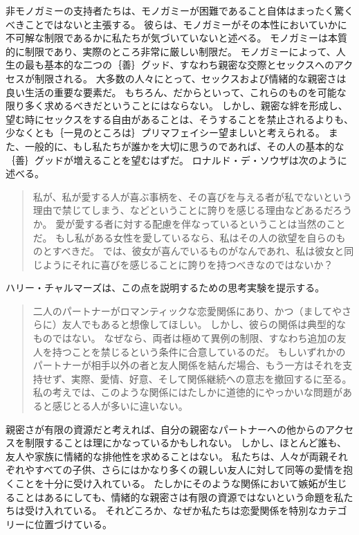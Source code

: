 \documentclass[paper=a4,book,openany]{jlreq}
\begin{document}
非モノガミーの支持者たちは、モノガミーが困難であること自体はまったく驚くべきことではないと主張する。
彼らは、モノガミーがその本性においていかに不可解な制限であるかに私たちが気づいていないと述べる。
モノガミーは本質的に制限であり、実際のところ非常に厳しい制限だ。
モノガミーによって、人生の最も基本的な二つの｛善｝{グッド}、すなわち親密な交際とセックスへのアクセスが制限される。
大多数の人々にとって、セックスおよび情緒的な親密さは良い生活の重要な要素だ。
もちろん、だからといって、これらのものを可能な限り多く求めるべきだということにはならない。
しかし、親密な絆を形成し、望む時にセックスをする自由があることは、そうすることを禁止されるよりも、少なくとも｛一見のところは｝{プリマフェイシー}望ましいと考えられる。
また、一般的に、もし私たちが誰かを大切に思うのであれば、その人の基本的な｛善｝{グッド}が増えることを望むはずだ。
ロナルド・デ・ソウザは次のように述べる。

\begin{quote}

私が、私が愛する人が喜ぶ事柄を、その喜びを与える者が私でないという理由で禁じてしまう、などということに誇りを感じる理由などあるだろうか。
愛が愛する者に対する配慮を伴なっているということは当然のことだ。
もし私がある女性を愛しているなら、私はその人の欲望を自らのものとすべきだ。
では、彼女が喜んでいるものがなんであれ、私は彼女と同じようにそれに喜びを感じることに誇りを持つべきなのではないか？ \citep{sousa18:_how_think_yours_out_jealous}
\end{quote}

ハリー・チャルマーズは、この点を説明するための思考実験を提示する。

\begin{quote}

二人のパートナーがロマンティックな恋愛関係にあり、かつ（ましてやさらに）友人でもあると想像してほしい。
しかし、彼らの関係は典型的なものではない。
なぜなら、両者は極めて異例の制限、すなわち追加の友人を持つことを禁じるという条件に合意しているのだ。
もしいずれかのパートナーが相手以外の者と友人関係を結んだ場合、もう一方はそれを支持せず、実際、愛情、好意、そして関係継続への意志を撤回するに至る。
私の考えでは、このような関係にはたしかに道徳的にやっかいな問題があると感じとる人が多いに違いない。
\citep[p.225]{chalmers19:_is_monog_moral_permis}
\end{quote}

親密さが有限の資源だと考えれば、自分の親密なパートナーへの他からのアクセスを制限することは理にかなっているかもしれない。
しかし、ほとんど誰も、友人や家族に情緒的な排他性を求めることはない。
私たちは、人々が両親それぞれやすべての子供、さらにはかなり多くの親しい友人に対して同等の愛情を抱くことを十分に受け入れている。
たしかにそのような関係において嫉妬が生じることはあるにしても、情緒的な親密さは有限の資源ではないという命題を私たちは受け入れている。
それどころか、なぜか私たちは恋愛関係を特別なカテゴリーに位置づけている。
\end{document}
